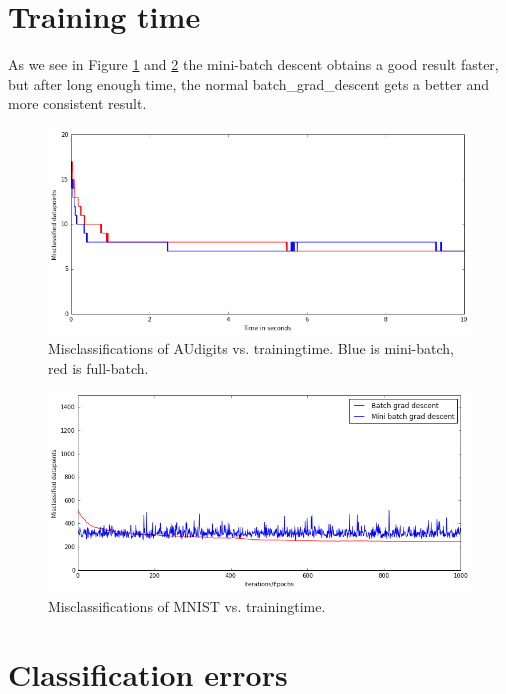 \documentclass[a4paper,10pt,article,oneside,english]{memoir}
\begin{document}
\section{Training time}
As we see in Figure \ref{fig:mini_batch} and \ref{fig:mini_batch2} the mini-batch descent obtains a good result faster, but after long enough time, the normal batch\_grad\_descent gets a better and more consistent result.
\begin{figure}[h!]
	\centering
	\includegraphics[width=\linewidth]{nll_plot2.png}
	\caption{Misclassifications of AUdigits vs. trainingtime. Blue is mini-batch, red is full-batch.}
	\label{fig:mini_batch}
\end{figure}
\begin{figure}[h!]
	\centering
	\includegraphics[width=\linewidth]{sm_plot2.png}
	\caption{Misclassifications of MNIST vs. trainingtime. }
	\label{fig:mini_batch2}
\end{figure}



\section{Classification errors}
\end{document}
